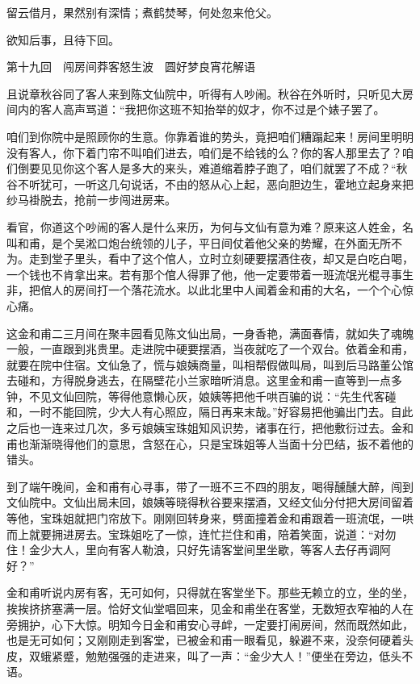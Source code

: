 \documentclass[12pt,UTF8]{ctexbook}
\begin{document}
{{{留云借月，果然别有深情；煮鹤焚琴，何处忽来伧父。

欲知后事，且待下回。





第十九回　闯房间莽客怒生波　圆好梦良宵花解语





且说章秋谷同了客人来到陈文仙院中，听得有人吵闹。秋谷在外听时，只听见大房间内的客人高声骂道：“我把你这班不知抬举的奴才，你不过是个婊子罢了。

咱们到你院中是照顾你的生意。你靠着谁的势头，竟把咱们糟蹋起来！房间里明明没有客人，你下着门帘不叫咱们进去，咱们是不给钱的么？你的客人那里去了？咱们倒要见见你这个客人是多大的来头，难道缩着脖子跑了，咱们就罢了不成？“秋谷不听犹可，一听这几句说话，不由的怒从心上起，恶向胆边生，霍地立起身来把纱马褂脱去，抢前一步闯进房来。

看官，你道这个吵闹的客人是什么来历，为何与文仙有意为难？原来这人姓金，名叫和甫，是个吴淞口炮台统领的儿子，平日间仗着他父亲的势耀，在外面无所不为。走到堂子里头，看中了这个倌人，立时立刻硬要摆酒住夜，却又是白吃白喝，一个钱也不肯拿出来。若有那个倌人得罪了他，他一定要带着一班流氓光棍寻事生非，把倌人的房间打一个落花流水。以此北里中人闻着金和甫的大名，一个个心惊心痛。

这金和甫二三月间在聚丰园看见陈文仙出局，一身香艳，满面春情，就如失了魂魄一般，一直跟到兆贵里。走进院中硬要摆酒，当夜就吃了一个双台。依着金和甫，就要在院中住宿。文仙急了，慌与娘姨商量，叫相帮假做叫局，叫到后马路董公馆去碰和，方得脱身逃去，在隔壁花小兰家暗听消息。这里金和甫一直等到一点多钟，不见文仙回院，等得他意懒心灰，娘姨等把他千哄百骗的说：“先生代客碰和，一时不能回院，少大人有心照应，隔日再来末哉。”好容易把他骗出门去。自此之后也一连来过几次，多亏娘姨宝珠姐知风识势，诸事在行，把他敷衍过去。金和甫也渐渐晓得他们的意思，含怒在心，只是宝珠姐等人当面十分巴结，扳不着他的错头。

到了端午晚间，金和甫有心寻事，带了一班不三不四的朋友，喝得醺醺大醉，闯到文仙院中。文仙出局未回，娘姨等晓得秋谷要来摆酒，又经文仙分付把大房间留着等他，宝珠姐就把门帘放下。刚刚回转身来，劈面撞着金和甫跟着一班流氓，一哄而上就要拥进房去。宝珠姐吃了一惊，连忙拦住和甫，陪着笑面，说道：“对勿住！金少大人，里向有客人勒浪，只好先请客堂间里坐歇，等客人去仔再调阿好？”

金和甫听说内房有客，无可如何，只得就在客堂坐下。那些无赖立的立，坐的坐，挨挨挤挤塞满一层。恰好文仙堂唱回来，见金和甫坐在客堂，无数短衣窄袖的人在旁拥护，心下大惊。明知今日金和甫安心寻衅，一定要打闹房间，然而既然如此，也是无可如何；又刚刚走到客堂，已被金和甫一眼看见，躲避不来，没奈何硬着头皮，双蛾紧蹙，勉勉强强的走进来，叫了一声：“金少大人！”便坐在旁边，低头不语。

}}}
\end{document}
